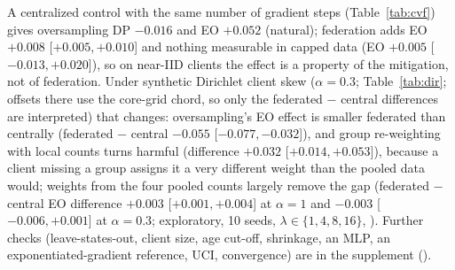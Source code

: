 A centralized control with the same number of gradient steps (Table~\ref{tab:cvf}) gives oversampling DP $-0.016$ and EO $+0.052$ (natural); federation adds EO $+0.008$ [$+0.005,+0.010$] and nothing measurable in capped data (EO $+0.005$ [$-0.013,+0.020$]), so on near-IID clients the effect is a property of the mitigation, not of federation. Under synthetic Dirichlet client skew ($\alpha{=}0.3$; Table~\ref{tab:dir}; offsets there use the core-grid chord, so only the federated $-$ central differences are interpreted) that changes: oversampling's EO effect is smaller federated than centrally (federated $-$ central $-0.055$ [$-0.077,-0.032$]), and group re-weighting with local counts turns harmful (difference $+0.032$ [$+0.014,+0.053$]), because a client missing a group assigns it a very different weight than the pooled data would; weights from the four pooled counts largely remove the gap (federated $-$ central EO difference $+0.003$ [$+0.001,+0.004$] at $\alpha{=}1$ and $-0.003$ [$-0.006,+0.001$] at $\alpha{=}0.3$; exploratory, 10 seeds, $\lambda\in\{1,4,8,16\}$, ). Further checks (leave-states-out, client size, age cut-off, shrinkage, an MLP, an exponentiated-gradient reference, UCI, convergence) are in the supplement ().
